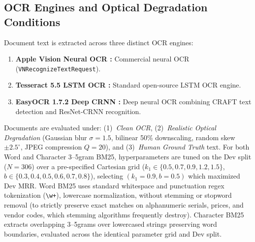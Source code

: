 \subsection{OCR Engines and Optical Degradation Conditions}
Document text is extracted across three distinct OCR engines:
\begin{enumerate}
    \setlength{\itemsep}{0pt}
    \setlength{\parskip}{0pt}
    \setlength{\parsep}{0pt}
    \setlength{\topsep}{1pt}
    \item \textbf{Apple Vision Neural OCR \cite{apple2020vision}:} Commercial neural OCR (\texttt{VNRecognizeTextRequest}).
    \item \textbf{Tesseract 5.5 LSTM OCR \cite{smith2007tesseract}:} Standard open-source LSTM OCR engine.
    \item \textbf{EasyOCR 1.7.2 Deep CRNN \cite{jaidedai2020easyocr}:} Deep neural OCR combining CRAFT text detection and ResNet-CRNN recognition.
\end{enumerate}
Documents are evaluated under: (1)~\emph{Clean OCR}, (2)~\emph{Realistic Optical Degradation} (Gaussian blur $\sigma=1.5$, bilinear 50\% downscaling, random skew $\pm 2.5^\circ$, JPEG compression $Q=20$), and (3)~\emph{Human Ground Truth} text. For both Word and Character 3--5gram BM25, hyperparameters are tuned on the Dev split ($N=306$) over a pre-specified Cartesian grid ($k_1 \in \{0.5, 0.7, 0.9, 1.2, 1.5\}$, $b \in \{0.3, 0.4, 0.5, 0.6, 0.7, 0.8\}$), selecting $(k_1=0.9, b=0.5)$ which maximized Dev MRR. Word BM25 uses standard whitespace and punctuation regex tokenization (\texttt{\textbackslash w+}), lowercase normalization, without stemming or stopword removal (to strictly preserve exact matches on alphanumeric serials, prices, and vendor codes, which stemming algorithms frequently destroy). Character BM25 extracts overlapping 3--5grams over lowercased strings preserving word boundaries, evaluated across the identical parameter grid and Dev split.

